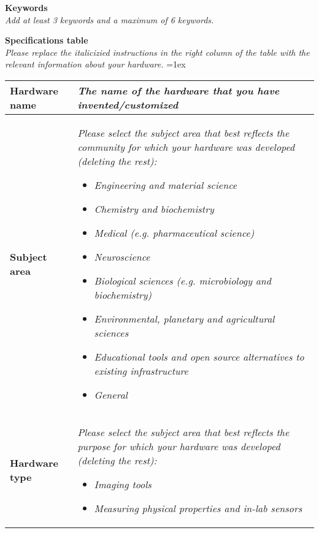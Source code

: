 \documentclass[11pt, letterpaper]{article}
\begin{document}
\begin{flushleft}
\textbf{Keywords}\\ \textit{Add at least 3 keywords and a maximum of 6 keywords.}

\newpage
\textbf{Specifications table}\\
\textit{Please replace the italicizied instructions in the right column of the table with the relevant information about your hardware.}
\vskip 0.2cm
\tabulinesep=1ex
\begin{tabu} to \linewidth {|X|X[3,l]|}
\hline  \textbf{Hardware name} & \textit{The name of the hardware that you have invented/customized}
  \\
  \hline \textbf{Subject area} & %
  \textit{Please select the subject area that best reflects the community for which your hardware was developed (deleting the rest):}
  \vskip 0.1cm
  \begin{itemize}[noitemsep, topsep=0pt]
  \item \textit{Engineering and material science}
  \item \textit{Chemistry and biochemistry}
  \item \textit{Medical (e.g. pharmaceutical science)}
  \item \textit{Neuroscience}
  \item \textit{Biological sciences (e.g. microbiology and biochemistry)}
  \item \textit{Environmental, planetary and agricultural sciences}
  \item \textit{Educational tools and open source alternatives to existing infrastructure}
  \item \textit{General}
  \end{itemize}
  \\
  \hline \textbf{Hardware type} &
    \textit{Please select the subject area that best reflects the purpose for which your hardware was developed (deleting the rest):}
  \vskip 0.1cm
  \begin{itemize}[noitemsep, topsep=0pt]
  \item \textit{Imaging tools}
  \item \textit{Measuring physical properties and in-lab sensors}

\end{itemize}
\end{tabu}
\end{flushleft}
\end{document}
